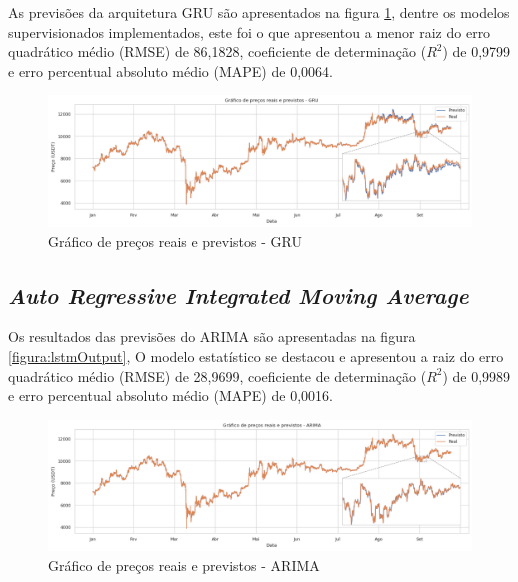 As previsões da arquitetura GRU são apresentados na figura \ref{figura:gruOutput}, dentre os modelos supervisionados implementados, este foi o que apresentou a menor raiz do erro quadrático médio (RMSE) de 86,1828, coeficiente de determinação ($R^2$) de 0,9799 e erro percentual absoluto médio (MAPE) de 0,0064.

\begin{figure}[!htb] \centering
  \caption{Gráfico de preços reais e previstos - GRU} \label{figura:gruOutput}
  \begin{varwidth}{\linewidth}
    \includegraphics[width=16cm]{figuras/gruOutput.png}
  \end{varwidth}
\end{figure}

\subsection{\textit{Auto Regressive Integrated Moving Average}}

Os resultados das previsões do ARIMA são apresentadas na figura \ref{figura:lstmOutput}, O modelo estatístico se destacou e apresentou a raiz do erro quadrático médio (RMSE) de 28,9699, coeficiente de determinação ($R^2$) de 0,9989 e erro percentual absoluto médio (MAPE) de 0,0016.

\begin{figure}[!htb] \centering
  \caption{Gráfico de preços reais e previstos - ARIMA} \label{figura:arimaOutput}
  \begin{varwidth}{\linewidth}
    \includegraphics[width=16cm]{figuras/arimaOutput.png}
  \end{varwidth}
\end{figure}

